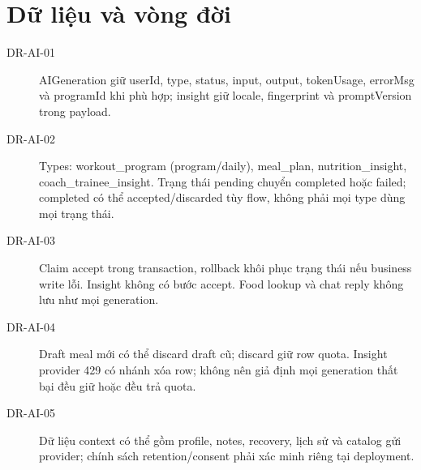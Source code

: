 \documentclass[12pt,a4paper]{article}
\begin{document}
\section{Dữ liệu và vòng đời}
\begin{description}
  \item[DR-AI-01] AIGeneration giữ userId, type, status, input, output, tokenUsage, errorMsg và programId khi phù hợp; insight giữ locale, fingerprint và promptVersion trong payload.
  \item[DR-AI-02] Types: workout\_program (program/daily), meal\_plan, nutrition\_insight, coach\_trainee\_insight. Trạng thái pending chuyển completed hoặc failed; completed có thể accepted/discarded tùy flow, không phải mọi type dùng mọi trạng thái.
  \item[DR-AI-03] Claim accept trong transaction, rollback khôi phục trạng thái nếu business write lỗi. Insight không có bước accept. Food lookup và chat reply không lưu như mọi generation.
  \item[DR-AI-04] Draft meal mới có thể discard draft cũ; discard giữ row quota. Insight provider 429 có nhánh xóa row; không nên giả định mọi generation thất bại đều giữ hoặc đều trả quota.
  \item[DR-AI-05] Dữ liệu context có thể gồm profile, notes, recovery, lịch sử và catalog gửi provider; chính sách retention/consent phải xác minh riêng tại deployment.
\end{description}
\end{document}
